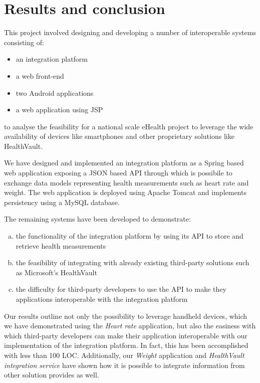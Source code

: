 \chapter{Results and conclusion}
\label{ch:conclusion}



This project involved designing and developing a number of interoperable systems
consisting of:
\begin{itemize}
\item an integration platform
\item a web front-end %
\item two Android applications
\item a web application using JSP
\end{itemize}
to analyse the feasibility for a national scale eHealth project to leverage
the wide availability of devices like smartphones and other proprietary solutions like
HealthVault.

We have designed and implemented an integration platform as a Spring based web
application exposing a JSON based API through which is possibile to exchange data models
representing health measurements such as heart rate and weight.
The web application is deployed using Apache Tomcat and implements
persistency using a MySQL database.

\clearpage
The remaining systems have been developed to demonstrate:
\begin{enumerate}[a.]
\item the functionality of the integration platform by using its API to store and retrieve health measurements
\item the feasibility of integrating with already existing third-party solutions such as Microsoft's HealthVault
\item the difficulty for third-party developers to use the API to make they applications interoperable with the integration platform
\end{enumerate}

Our results outline not only the possibility to leverage handheld devices, which we have demonstrated using
the \textit{Heart rate} application, but also the easiness with which third-party developers can make
their application interoperable with our implementation of the integration platform.
In fact, this has been accomplished with less than 100 LOC.
Additionally, our \textit{Weight} application and \textit{HealthVault integration service}
have shown how it is possible to integrate information from other solution provides as well.

